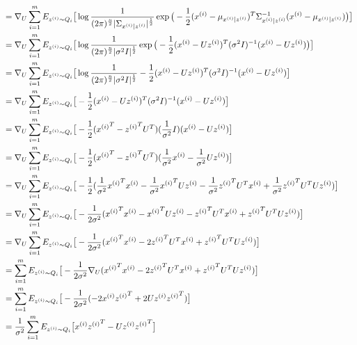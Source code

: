 \documentclass[11pt]{article}
\begin{document}
\begin{align*}
    &= \nabla_U \sum_{i=1}^m E_{z^{(i)} \sim Q_i}
        \big[ \log \frac{1}{(2 \pi)^{\frac{n}{2}}|\Sigma_{x^{(i)}|z^{(i)}}|^{\frac{1}{2}}} 
              \exp \big(-\frac{1}{2}(x^{(i)} - \mu_{x^{(i)}|z^{(i)}})^T \Sigma_{x^{(i)}|z^{(i)}}^{-1} (x^{(i)} - \mu_{x^{(i)}|z^{(i)}}) \big) \big] \\
    &= \nabla_U \sum_{i=1}^m E_{z^{(i)} \sim Q_i}
        \big[ \log \frac{1}{(2 \pi)^{\frac{n}{2}}|\sigma^2 I|^{\frac{1}{2}}} 
              \exp \big(-\frac{1}{2}(x^{(i)} - Uz^{(i)})^T (\sigma^2 I)^{-1} (x^{(i)} - Uz^{(i)}) \big) \big] \\
    &= \nabla_U \sum_{i=1}^m E_{z^{(i)} \sim Q_i}
        \big[ \log \frac{1}{(2 \pi)^{\frac{n}{2}}|\sigma^2 I|^{\frac{1}{2}}} 
              -\frac{1}{2}(x^{(i)} - Uz^{(i)})^T (\sigma^2 I)^{-1} (x^{(i)} - Uz^{(i)}) \big] \\
    &= \nabla_U \sum_{i=1}^m E_{z^{(i)} \sim Q_i}
        \big[ -\frac{1}{2}(x^{(i)} - Uz^{(i)})^T (\sigma^2 I)^{-1} (x^{(i)} - Uz^{(i)}) \big] \\
    &= \nabla_U \sum_{i=1}^m E_{z^{(i)} \sim Q_i}
        \big[ -\frac{1}{2}({x^{(i)}}^T - {z^{(i)}}^T U^T) (\frac{1}{\sigma^2}I) (x^{(i)} - Uz^{(i)}) \big] \\
    &= \nabla_U \sum_{i=1}^m E_{z^{(i)} \sim Q_i}
        \big[ -\frac{1}{2}({x^{(i)}}^T - {z^{(i)}}^T U^T) (\frac{1}{\sigma^2} x^{(i)} - \frac{1}{\sigma^2} Uz^{(i)}) \big] \\
    &= \nabla_U \sum_{i=1}^m E_{z^{(i)} \sim Q_i}
        \big[ -\frac{1}{2}(\frac{1}{\sigma^2} {x^{(i)}}^T x^{(i)} - \frac{1}{\sigma^2} {x^{(i)}}^T U z^{(i)} - \frac{1}{\sigma^2} {z^{(i)}}^T U^T x^{(i)} + \frac{1}{\sigma^2} {z^{(i)}}^T U^T U z^{(i)}) \big] \\
    &= \nabla_U \sum_{i=1}^m E_{z^{(i)} \sim Q_i}
        \big[ -\frac{1}{2 \sigma^2}({x^{(i)}}^T x^{(i)} - {x^{(i)}}^T U z^{(i)} - {z^{(i)}}^T U^T x^{(i)} + {z^{(i)}}^T U^T U z^{(i)}) \big] \\
    &= \nabla_U \sum_{i=1}^m E_{z^{(i)} \sim Q_i}
        \big[ -\frac{1}{2 \sigma^2}({x^{(i)}}^T x^{(i)} - 2 {z^{(i)}}^T U^T x^{(i)} + {z^{(i)}}^T U^T U z^{(i)}) \big] \\
    &= \sum_{i=1}^m E_{z^{(i)} \sim Q_i}
        \big[ -\frac{1}{2 \sigma^2} \nabla_U ({x^{(i)}}^T x^{(i)} - 2 {z^{(i)}}^T U^T x^{(i)} + {z^{(i)}}^T U^T U z^{(i)}) \big] \\
    &= \sum_{i=1}^m E_{z^{(i)} \sim Q_i}
        \big[ -\frac{1}{2 \sigma^2} (-2 x^{(i)} {z^{(i)}}^T + 2 U z^{(i)} {z^{(i)}}^T) \big] \\
    &= \frac{1}{\sigma^2} \sum_{i=1}^m E_{z^{(i)} \sim Q_i}
        \big[x^{(i)} {z^{(i)}}^T - U z^{(i)} {z^{(i)}}^T \big] \\
\end{align*}
\end{document}
